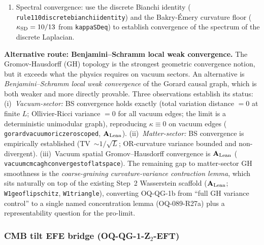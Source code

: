 \documentclass[11pt]{article}
\theoremstyle{remark}
\newcommand{\lean}[1]{%
  \penalty-100
  \begingroup\def\_{\textunderscore\allowbreak}\texttt{#1}\endgroup}
\newcommand{\CatAL}{\ensuremath{\textbf{A}_{\rm Lean}}}
\begin{document}
\begin{enumerate}[label=(\arabic*)]
  zero sorry in \lean{UgpLean.ContinuumLimit.WassersteinDistance}.
  The $W_1$ property scaffold is fully machine-certified. Vacuum spatial
  Gromov--Hausdorff convergence is \CatAL{}
  (\lean{vacuum\_cmca\_gh\_converges\_to\_flat\_space}).
  Matter-sector and Lorentzian GH convergence remain the open formal certificate tasks
  (OQ-QG-1b, OQ-QG-1c): Cheeger--Colding regularity theory for OQ-QG-1b, Lorentzian
  Gromov--Hausdorff theory for OQ-QG-1c.
\item Spectral convergence: use the discrete Bianchi identity
  (\lean{rule110\_discrete\_bianchi\_identity}) and the Bakry-\'Emery curvature floor
  ($\kappa_{\rm SD} = 10/13$ from \lean{kappa\_SD\_eq\_10\_13}) to establish
  convergence of the spectrum of the discrete Laplacian.
\end{enumerate}

\smallskip\noindent\textbf{Alternative route: Benjamini--Schramm local weak convergence.}\enspace
The Gromov-Hausdorff (GH) topology is the strongest geometric convergence notion, but
it exceeds what the physics requires on vacuum sectors.  An alternative is
\emph{Benjamini--Schramm local weak convergence} of the Gorard causal graph, which is
both weaker and more directly provable.  Three observations establish its status:
(i)~\textit{Vacuum-sector:} BS convergence holds exactly (total variation distance $= 0$
at finite $L$; Ollivier-Ricci variance $= 0$ for all vacuum edges; the limit is a
deterministic unimodular graph), reproducing $\kappa \equiv 0$ on vacuum edges
(\lean{gorard\_vacuum\_oric\_zero\_scoped}, $\CatAL$).
(ii)~\textit{Matter-sector:} BS convergence is empirically established (TV~$\sim 1/\sqrt{L}$;
OR-curvature variance bounded and non-divergent).
(iii)~Vacuum spatial Gromov--Hausdorff convergence is \CatAL{}
(\lean{vacuum\_cmca\_gh\_converges\_to\_flat\_space}). The remaining gap to matter-sector
GH smoothness is the \emph{coarse-graining curvature-variance contraction lemma}, which
sits naturally on top of the existing Step~2 Wasserstein scaffold ($\CatAL$;
\lean{W1\_ge\_of\_lipschitz}, \lean{W1\_triangle}), converting OQ-QG-1b from ``full GH
variance control'' to a single named concentration lemma (OQ-089-R27a) plus a
representability question for the pro-limit.

\subsubsection{CMB tilt EFE bridge (OQ-QG-1-Z$_2$-EFT)}
\end{document}
